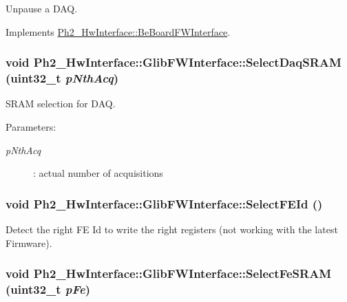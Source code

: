 Unpause a DAQ. 



Implements \hyperlink{class_ph2___hw_interface_1_1_be_board_f_w_interface_5d48a64b90e48d8bd897fca48482baf8}{Ph2\_\-Hw\-Interface::Be\-Board\-FWInterface}.\hypertarget{class_ph2___hw_interface_1_1_glib_f_w_interface_0b6b576606e87a52598c3dd3b314c62e}{
\subsubsection[SelectDaqSRAM]{\setlength{\rightskip}{0pt plus 5cm}void Ph2\_\-Hw\-Interface::Glib\-FWInterface::Select\-Daq\-SRAM (uint32\_\-t {\em p\-Nth\-Acq})}}
\label{class_ph2___hw_interface_1_1_glib_f_w_interface_0b6b576606e87a52598c3dd3b314c62e}


SRAM selection for DAQ. 

\begin{Desc}
\item[Parameters:]
\begin{description}
\item[{\em p\-Nth\-Acq}]: actual number of acquisitions \end{description}
\end{Desc}
\hypertarget{class_ph2___hw_interface_1_1_glib_f_w_interface_2ce120711b8a58610f779813064d2c8f}{
\subsubsection[SelectFEId]{\setlength{\rightskip}{0pt plus 5cm}void Ph2\_\-Hw\-Interface::Glib\-FWInterface::Select\-FEId ()}}
\label{class_ph2___hw_interface_1_1_glib_f_w_interface_2ce120711b8a58610f779813064d2c8f}


Detect the right FE Id to write the right registers (not working with the latest Firmware). 

\hypertarget{class_ph2___hw_interface_1_1_glib_f_w_interface_d7974fd2dee37135dc6cc3997d083037}{
\subsubsection[SelectFeSRAM]{\setlength{\rightskip}{0pt plus 5cm}void Ph2\_\-Hw\-Interface::Glib\-FWInterface::Select\-Fe\-SRAM (uint32\_\-t {\em p\-Fe})}}
\label{class_ph2___hw_interface_1_1_glib_f_w_interface_d7974fd2dee37135dc6cc3997d083037}


